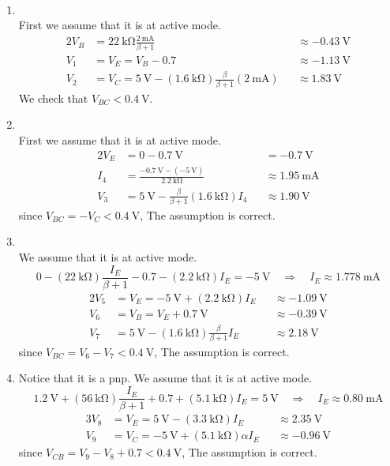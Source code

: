 \documentclass[12pt, a4paper]{article}
\begin{document}
\Ans \\

\begin{enumerate}
  \item \\
    First we assume that it is at active mode.
    \begin{alignat*}{2}
      V_B &  = \SI{22}\kohm \frac{\SI{2}\mA}{\beta + 1} && \approx \SI{-0.43}{\V} \\
      V_1 &  = V_E = V_B - 0.7 &&\approx \SI{-1.13}\V \\
      V_2 &  = V_C = \SI{5}\V - (\SI{1.6}\kohm) \frac{\beta}{\beta + 1} (\SI{2}\mA) &&\approx \SI{1.83}\V
    \end{alignat*}
    We check that $V_{BC} < \SI{0.4}\V$.
  \item \\
    First we assume that it is at active mode.
    \begin{alignat*}{2}
      V_E & = 0 - \SI{0.7}\V &&= \SI{-0.7}\V \\
      I_4 & = \frac{ \SI{-0.7}{\V} - (\SI{-5}\V) }{ \SI{2.2}\kohm } 
      && \approx \SI{1.95}\mA \\
      V_3 & = \SI{5}\V - \frac{\beta}{\beta + 1} (\SI{1.6}\kohm) I_4 
      && \approx \SI{1.90}\V 
    \end{alignat*}
    since $V_{BC} = -V_C < \SI{0.4}\V$, The assumption is correct.
  \item \\
    We assume that it is at active mode.
    \[
      0 - (\SI{22}{\kohm}) \frac{I_E}{\beta + 1} - 0.7 - (\SI{2.2}\kohm) I_E = \SI{-5}{\V} \quad \Rightarrow \quad I_E \approx \SI{1.778}\mA
    \]
    \begin{alignat*}{2}
      V_5 & = V_E = -\SI{5}\V + (\SI{2.2}\kohm) I_E && \approx \SI{-1.09}\V\\
      V_6 & = V_B = V_E + \SI{0.7}\V && \approx \SI{-0.39}\V \\
      V_7 & = \SI{5}\V - (\SI{1.6}\kohm) \frac{\beta}{\beta + 1} I_E && \approx \SI{2.18}\V
    \end{alignat*}
    since $V_{BC} = V_6 - V_7 < \SI{0.4}\V$, The assumption is correct.

  \item Notice that it is a pnp. We assume that it is at active mode.
    \[
      \SI{1.2}\V + (\SI{56}{\kohm}) \frac{I_E}{\beta + 1} + 0.7 + (\SI{5.1}\kohm) I_E = \SI{5}{\V} \quad \Rightarrow \quad I_E \approx \SI{0.80}\mA
    \]
    \begin{alignat*}{3}
      V_8 & = V_E = \SI{5}\V - (\SI{3.3}\kohm)  I_E && \approx \SI{2.35}\V \\
      V_9 & = V_C = -\SI{5}\V + (\SI{5.1}\kohm) \alpha I_E && \approx \SI{-0.96}\V
    \end{alignat*}
    since $V_{CB} = V_9 - V_8 + 0.7 < \SI{0.4}\V$, The assumption is correct.


\end{enumerate}
\end{document}
